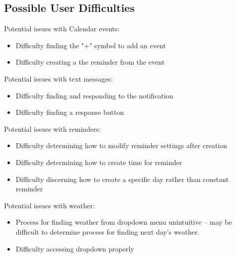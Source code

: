 \subsection{Possible User Difficulties}
Potential issues with Calendar events:
\begin{itemize}
\item Difficulty finding the "+" symbol to add an event
\item Difficulty creating a the reminder from the event
\end{itemize}
Potential issues with text messages:
\begin{itemize}
\item Difficulty finding and responding to the notification
\item Difficulty finding a response button
\end{itemize}
Potential issues with reminders:
\begin{itemize}
\item Difficulty determining how to modify reminder settings after creation
\item Difficulty determining how to create time for reminder
\item Difficulty discerning how to create a specific day rather than constant reminder
\end{itemize}
Potential issues with weather:
\begin{itemize}
\item Process for finding weather from dropdown menu unintuitive -- may be difficult to determine process for finding next day's weather.
\item Difficulty accessing dropdown properly
\end{itemize}



